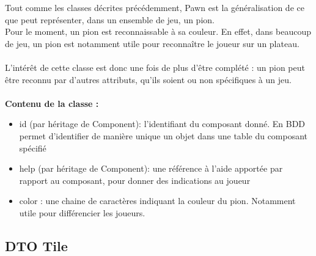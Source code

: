 \documentclass{article}
\begin{document}
                Tout comme les classes décrites précédemment, Pawn est la généralisation de ce que peut représenter, dans un ensemble de jeu, un pion.\\
                \indent Pour le moment, un pion est reconnaissable à sa couleur. En effet, dans beaucoup de jeu, un pion est notamment utile pour reconnaître le joueur sur un plateau. \\
                \\
                \indent L'intérêt de cette classe est donc une fois de plus d'être complété : un pion peut être reconnu par d'autres attributs, qu'ils soient ou non spécifiques à un jeu.\\
                \\
                \textbf{Contenu de la classe :}
                \begin{itemize}
                    \item id (par héritage de Component): l'identifiant du composant donné. En BDD permet d'identifier de manière unique un objet dans une table du composant spécifié
                    \item help (par héritage de Component): une référence à l'aide apportée par rapport au composant, pour donner des indications au joueur
                    \item color : une chaine de caractères indiquant la couleur du pion. Notamment utile pour différencier les joueurs.
                \end{itemize}

            \subsection{DTO Tile}
\end{document}
